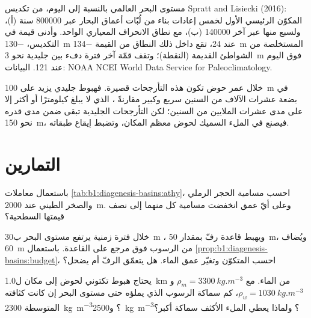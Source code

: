 \begin{omfigure}
{\small مستوى البحر العالمي بالنسبة إلى اليوم، من تكديس Spratt and Lisiecki (2016): المكوّن الرئيسي الأول لخمس إعادات بناء من لُبّات أعماق البحار عبر \num{800000} سنة (أ)، ولسبع منها عبر آخر \num{140000} (ب)، مع نطاق الانحراف المعياري الواحد. وأدنى قيمة في التكديس، \qty{-130}{m} عند \qty{24}{\ka}، تقع داخل ذلك النطاق من القيمة \qty{-134}{m} المستخلصة من الشواطئ القديمة (النقطة)؛ وتقف قمّة آخر فترة دفء بين جليدية نحو \qty{3}{m} فوق اليوم عند \qty{121}{\ka}. البيانات: NOAA NCEI World Data Service for Paleoclimatology.}
\label{fig:b1:diagenesis-basins:sea-level}
\end{omfigure}

خلال عمر حوض تكون هذه التأرجحات قصيرة. فهبوط جليدي يزيد على \qty{100}{m} في بضعة عشرات الآلاف من السنين سريع وكبير مقارنةً ، الذي لا يبلغ كيلومترًا أو أكثر إلا على مدى عشرات الملايين من السنين؛ لكن التأرجحات الجليدية تبقى ضمن مدى قدره نحو \qty{150}{m}، فيصنع  في الملء السميك لحوض معظم المكان، وتضبط  إيقاع طبقاته.

\section{التمارين}

\begin{exercise}[$\star$]\label{exo:b1:diagenesis-basins:1}
باستعمال معاملات \cref{tab:b1:diagenesis-basins:athy}، احسب مسامية الحجر الرملي والصخر الطيني عند \qty{2000}{m}. وعلى أيّ عمق انخفضت مسامية كل منهما إلى نصف قيمتها السطحية؟
\end{exercise}

\begin{exercise}[$\star$]\label{exo:b1:diagenesis-basins:2}
خلال فترة زمنية يرتفع مستوى البحر ب\qty{30}{m} ، ويهبط قاعدة رفّ بمقدار \qty{50}{m}، ويُضاف \qty{60}{m} من الرسوب فوق مرجع على القاعدة. باستعمال \cref{prop:b1:diagenesis-basins:budget}، احسب  المتكوّن وتغيّر عمق الماء. هل يتعمّق الرفّ أم يضحل؟
\end{exercise}

\begin{exercise}[$\star$]\label{exo:b1:diagenesis-basins:3}
يحتاج هبوط تكتوني لحوض إلى مكان ل\qty{1.0}{km} من الماء. مع $\rho_m = \qty{3300}{kg.m^{-3}}$ و$\rho_w = \qty{1030}{kg.m^{-3}}$، كم سماكة الرسوب الذي يملؤه حتى مستوى البحر إن كانت كثافته المتوسطة \qty{2300}{kg.m^{-3}}؟ و\qty{2500}{kg.m^{-3}}؟ ولماذا يعطي الملء الأكثف سماكة أكبر؟
\end{exercise}

